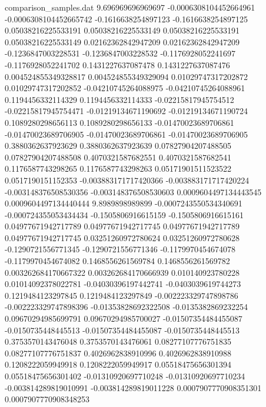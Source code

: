 \begin{filecontents}{comparison_samples.dat}
9.696969696969697   -0.0006308104452664961  -0.0006308104452665742  -0.1616638254897123    -0.1616638254897125    0.05038216225533191    0.05038216225533149    0.05038216225533191    0.05038216225533149    0.02162362842947209    0.02162362842947209    -0.1236847003228531     -0.1236847003228532     -0.1176928052241697    -0.1176928052241702    0.1431227637087478      0.1431227637087476      0.004524855349328817    0.004524855349329094    0.01029747317202872     0.01029747317202852     -0.04210745264088975    -0.04210745264088961    0.1194456332114329      0.1194456332114333      -0.02215817945754512    -0.02215817945754471    -0.01219134671190692   -0.01219134671190724   0.1089280298656113     0.1089280298656133     -0.01470023689706861    -0.01470023689706905    -0.01470023689706861    -0.01470023689706905    0.3880362637923629     0.3880362637923639     0.07827904207488505     0.07827904207488508     0.4070321587682551     0.4070321587682541     0.1176587743298265      0.1176587743298263      0.05171901511523522     0.0517190151152353      -0.003883171717420366  -0.003883171717420224  -0.003148376508530356  -0.003148376508530603  0.0009604497134443545   0.0009604497134440444 
9.8989898989899     -0.0007243550534340691  -0.000724355053434434   -0.1505806916615159    -0.1505806916615161    0.04977671942717789    0.04977671942717745    0.04977671942717789    0.04977671942717745    0.03251260972780624    0.03251260972780628    -0.1290721556771345     -0.1290721556771346     -0.1179970454674078    -0.1179970454674082    0.1468556261569784      0.1468556261569782      0.003262684170667322    0.003262684170666939    0.010140923780228       0.01014092378022781     -0.04030396197442741    -0.0403039619744273     0.1219484123297845      0.1219484123297849      -0.002223329747898786   -0.002223329747898396   -0.01353828692322508   -0.0135382869232254    0.09670294985699791    0.09670294985700027    -0.01507354484455087    -0.0150735448445513     -0.01507354484455087    -0.0150735448445513     0.3753570143476048     0.3753570143476061     0.08277107776751835     0.08277107776751837     0.4026962838910996     0.4026962838910988     0.1208222059949918      0.1208222059949917      0.05518475656301394     0.05518475656301402     -0.01310920697710248   -0.01310920697710234   -0.003814289819010991  -0.003814289819011228  0.0007907770908351301   0.0007907770908348253 

\end{filecontents}
